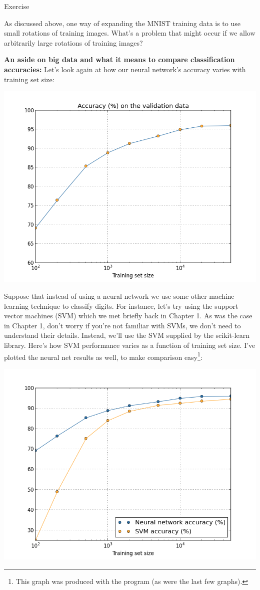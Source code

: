 \documentclass[a4paper,twoside,10pt]{book}
\begin{document}
\begin{exercize}{Exercise}
	\item As discussed above, one way of expanding the MNIST training data is to use small rotations of training images. What's a problem that might occur if we allow arbitrarily large rotations of training images?
\end{exercize}
\textbf{An aside on big data and what it means to compare classification accuracies:} Let's look again at how our neural network's accuracy varies with training set size:
\begin{center}
	\includegraphics[width=0.7\linewidth]{figures/ch3/more_data_log}
\end{center}
Suppose that instead of using a neural network we use some other machine learning technique to classify digits. For instance, let's try using the support vector machines (SVM) which we met briefly back in Chapter 1. As was the case in Chapter 1, don't worry if you're not familiar with SVMs, we don't need to understand their details. Instead, we'll use the SVM supplied by the scikit-learn library. Here's how SVM performance varies as a function of training set size. I've plotted the neural net results as well, to make comparison easy\footnote{This graph was produced with the program  (as were the last few graphs).}:
\begin{center}
	\includegraphics[width=0.7\linewidth]{figures/ch3/more_data_comparison}
\end{center}
\end{document}
